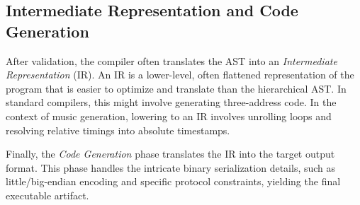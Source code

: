 \subsection{Intermediate Representation and Code Generation}

After validation, the compiler often translates the AST into an \textit{Intermediate Representation} (IR).
An IR is a lower-level, often flattened representation of the program that is easier to optimize and
translate than the hierarchical AST.
In standard compilers, this might involve generating three-address code.
In the context of music generation, lowering to an IR involves unrolling loops and resolving relative timings
into absolute timestamps.

Finally, the \textit{Code Generation} phase translates the IR into the target output format.
This phase handles the intricate binary serialization details, such as little/big-endian encoding and
specific protocol constraints, yielding the final executable artifact.
